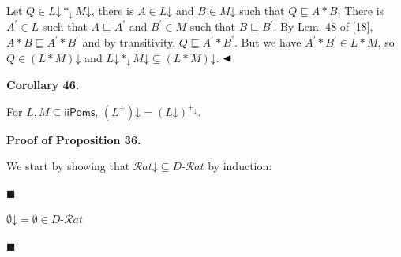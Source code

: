 \documentclass[10pt,a4paper]{article}
\begin{document}
 
 
Let $Q\in L\mathord{\downarrow}*_{\mathord{\downarrow}}M\mathord{\downarrow}$, there is $A\in L\mathord{\downarrow}$ and $B\in M\mathord{\downarrow}$ such that $Q\sqsubseteq A*B$. There is $A^{\prime}\in L$ such that $A\sqsubseteq A^{\prime}$ and $B^{\prime}\in M$ such that $B\sqsubseteq B^{\prime}$. By Lem. 48 of [18], $A*B\sqsubseteq A^{\prime}*B^{\prime}$ and by transitivity, $Q\sqsubseteq A^{\prime}*B^{\prime}$. But we have $A^{\prime}*B^{\prime}\in L*M$, so $Q\in(L*M)\mathord{\downarrow}$ and $L\mathord{\downarrow}*_{\mathord{\downarrow}}M\mathord{\downarrow}\subseteq(L*M)\mathord{\downarrow}$. $\hfill\blacktriangleleft$\par
 
 
 
\par\medskip\noindent\textbf{Corollary 46.}\par
 
 
For $L,M\subseteq\mathsf{iiPoms}$, $(L^{+})\mathord{\downarrow}=(L\mathord{\downarrow})^{+_{\mathord{\downarrow}}}$.\par
 
 
 
 
 
\par\medskip\noindent\textbf{Proof of Proposition 36.}\par
 
 
We start by showing that $\mathcal{R}at\mathord{\downarrow}\subseteq D\text{-}\mathcal{R}at$ by induction:\par
  
\par\noindent  $\blacksquare$ 
 
$\emptyset\mathord{\downarrow}=\emptyset\in D\text{-}\mathcal{R}at$\par
 
 
 
\par\noindent  $\blacksquare$ 
 
\end{document}
